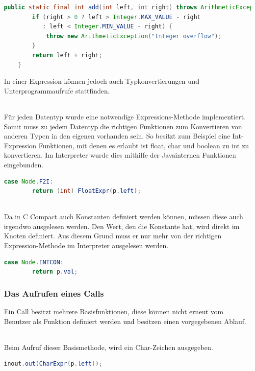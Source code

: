 \begin{lstlisting}[language=JAVA]
	public static final int add(int left, int right) throws ArithmeticException {
		if (right > 0 ? left > Integer.MAX_VALUE - right
           : left < Integer.MIN_VALUE - right) {
			throw new ArithmeticException("Integer overflow");
		}
		return left + right;
	}
\end{lstlisting}

In einer Expression können jedoch auch Typkonvertierungen und Unterprogrammaufrufe stattfinden.

\\
Für jeden Datentyp wurde eine notwendige Expressions-Methode implementiert. Somit muss zu jedem Datentyp die richtigen Funktionen zum Konvertieren von anderen Typen in den eigenen vorhanden sein. So besitzt zum Beispiel eine Int-Expression Funktionen, mit denen es erlaubt ist float, char und boolean zu int zu konvertieren.
Im Interpreter wurde dies mithilfe der Javainternen Funktionen eingebunden. 

\begin{lstlisting}[language=JAVA]
case Node.F2I:
		return (int) FloatExpr(p.left);
\end{lstlisting}


\\
Da in C Compact auch Konstanten definiert werden können, müssen diese auch irgendwo ausgelesen werden. Den Wert, den die Konstante hat, wird direkt im Knoten definiert. Aus diesem Grund muss er nur mehr von der richtigen Expression-Methode im Interpreter ausgelesen werden.

\begin{lstlisting}[language=JAVA]
case Node.INTCON:
		return p.val;
\end{lstlisting}

\subsubsection{Das Aufrufen eines Calls}
Ein Call besitzt mehrere Basisfunktionen, diese können nicht erneut vom Benutzer als Funktion definiert werden und besitzen einen vorgegebenen Ablauf.

\\
Beim Aufruf dieser Basismethode, wird ein Char-Zeichen ausgegeben.
\begin{lstlisting}[language=JAVA]
inout.out(CharExpr(p.left));
\end{lstlisting}

